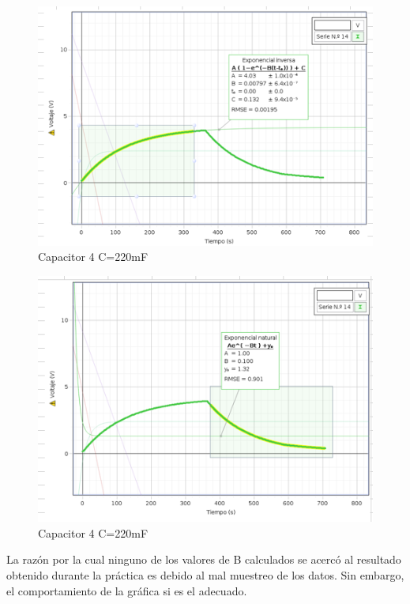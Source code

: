 \documentclass{article}
\begin{document}
\begin{figure}[H]
   \centering 
   \includegraphics[scale=0.5]{../imgs/r6.png}
   \caption{Capacitor 4 C=220mF}
   \label{Fig:7}
\end{figure}

\begin{figure}[H]
   \centering 
   \includegraphics[scale=0.5]{../imgs/r7.png}
   \caption{Capacitor 4 C=220mF}
   \label{Fig:8}
\end{figure}

La razón por la cual ninguno de los valores de B calculados se acercó al resultado obtenido durante la práctica es debido al mal muestreo de los datos. Sin embargo, el comportamiento de la gráfica si es el adecuado.
\end{document}
